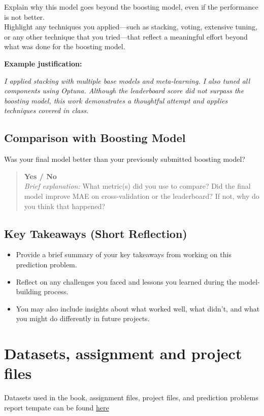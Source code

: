 \documentclass[
  letterpaper,
  DIV=11,
  numbers=noendperiod]{scrreprt}
\providecommand{\tightlist}{%
  \setlength{\itemsep}{0pt}\setlength{\parskip}{0pt}}\usepackage{longtable,booktabs,array}
\begin{document}
Explain why this model goes beyond the boosting model, even if the
performance is not better.\\
Highlight any techniques you applied---such as stacking, voting,
extensive tuning, or any other technique that you tried---that reflect a
meaningful effort beyond what was done for the boosting model.

\textbf{Example justification:}

\emph{I applied stacking with multiple base models and meta-learning. I
also tuned all components using Optuna. Although the leaderboard score
did not surpass the boosting model, this work demonstrates a thoughtful
attempt and applies techniques covered in class.}

\section{Comparison with Boosting
Model}\label{comparison-with-boosting-model}

Was your final model better than your previously submitted boosting
model?

\begin{quote}
\textbf{Yes / No}\\
\emph{Brief explanation:} What metric(s) did you use to compare? Did the
final model improve MAE on cross-validation or the leaderboard? If not,
why do you think that happened?
\end{quote}

\section{Key Takeaways (Short
Reflection)}\label{key-takeaways-short-reflection}

\begin{itemize}
\tightlist
\item
  Provide a brief summary of your key takeaways from working on this
  prediction problem.
\item
  Reflect on any challenges you faced and lessons you learned during the
  model-building process.
\item
  You may also include insights about what worked well, what didn't, and
  what you might do differently in future projects.
\end{itemize}

\chapter{Datasets, assignment and project
files}\label{datasets-assignment-and-project-files}

Datasets used in the book, assignment files, project files, and
prediction problems report tempate can be found
\href{https://nuwildcat-my.sharepoint.com/:f:/g/personal/lsi8012_ads_northwestern_edu/EoFpYaluaQhCtdC_nsWbcWUBcEZIw54odn3ssRMRQ1B8DA?e=Bb4YaM}{here}
\end{document}
